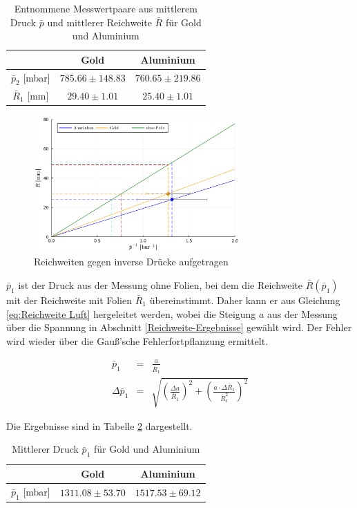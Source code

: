 \documentclass[12pt,a4paper]{scrartcl}
\numberwithin{equation}{section} %
\begin{document}
\begin{table}[H]
	\centering
	\begin{tabular}{||c||c|c||}
		\hline
		& Gold & Aluminium \\
		\hline \hline
		$\bar{p}_2$ [mbar] & $785.66 \pm 148.83$ & $760.65 \pm 219.86$ \\
		\hline
		$\bar{R}_1$ [mm] & $29.40 \pm 1.01$ & $25.40 \pm 1.01$\\
		\hline
	\end{tabular}
	\caption{Entnommene Messwertpaare aus mittlerem Druck $\bar{p}$ und mittlerer Reichweite $\bar{R}$ für Gold und Aluminium}
	\label{table_mittlereDrücke_mitFolie}
\end{table}

\begin{figure}[H]
	\centering
	\includegraphics[width=0.7\textwidth]{../media/B3.3/reichweiten inverse druecke mit Folien.pdf}
	\caption{Reichweiten gegen inverse Drücke aufgetragen}
	\label{fig:reichweiteDrückeFolie}
\end{figure}

$\bar{p}_1$ ist der Druck aus der Messung ohne Folien, bei dem die Reichweite $\bar R(\bar p_1)$ mit der Reichweite mit Folien $\bar{R}_1$ übereinstimmt. Daher kann er aus Gleichung \eqref{eq:Reichweite Luft} hergeleitet werden, wobei die Steigung $a$ aus der Messung über die Spannung in Abschnitt \ref{Reichweite-Ergebnisse} gewählt wird. Der Fehler wird wieder über die Gauß'sche Fehlerfortpflanzung ermittelt.

\begin{eqnarray}
	\bar{p}_1 &=& \frac{a}{\bar{R}_1} \\
	\Delta \bar{p}_1 &=&
		\sqrt{\left(\frac{\Delta a}{\bar{R}_1}\right)^2 + \left(\frac{a \cdot \Delta \bar{R}_1}{\bar{R}_1^2}\right)^2}
\end{eqnarray}

Die Ergebnisse sind in Tabelle \ref{table_p_1} dargestellt.
\begin{table}[H]
	\centering
	\begin{tabular}{||c||c|c||}
		\hline
		& Gold & Aluminium \\
		\hline \hline
		$\bar{p}_1$ [mbar] & $1311.08 \pm 53.70$ & $1517.53 \pm 69.12$ \\
		\hline
	\end{tabular}
	\caption{Mittlerer Druck $\bar{p}_1$ für Gold und Aluminium}
	\label{table_p_1}
\end{table}
\end{document}
